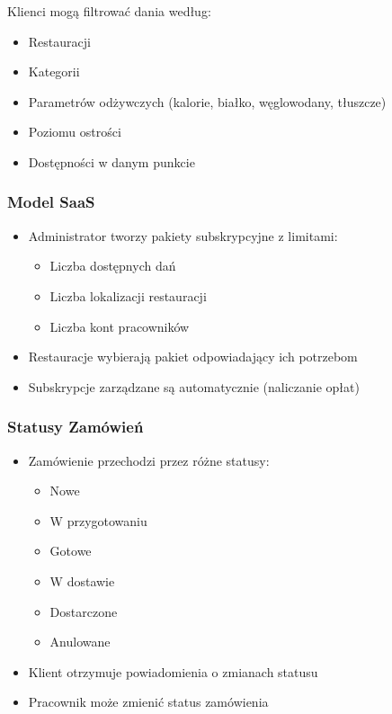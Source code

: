 \documentclass[12pt,a4paper,utf-8]{article}
\begin{document}
Klienci mogą filtrować dania według:
\begin{itemize}
    \item Restauracji
    \item Kategorii
    \item Parametrów odżywczych (kalorie, białko, węglowodany, tłuszcze)
    \item Poziomu ostrości
    \item Dostępności w danym punkcie
\end{itemize}

\subsubsection{Model SaaS}

\begin{itemize}
    \item Administrator tworzy pakiety subskrypcyjne z limitami:
    \begin{itemize}
        \item Liczba dostępnych dań
        \item Liczba lokalizacji restauracji
        \item Liczba kont pracowników
    \end{itemize}
    \item Restauracje wybierają pakiet odpowiadający ich potrzebom
    \item Subskrypcje zarządzane są automatycznie (naliczanie opłat)
\end{itemize}

\subsubsection{Statusy Zamówień}

\begin{itemize}
    \item Zamówienie przechodzi przez różne statusy:
    \begin{itemize}
        \item Nowe
        \item W przygotowaniu
        \item Gotowe
        \item W dostawie
        \item Dostarczone
        \item Anulowane
    \end{itemize}
    \item Klient otrzymuje powiadomienia o zmianach statusu
    \item Pracownik może zmienić status zamówienia
\end{itemize}
\end{document}
